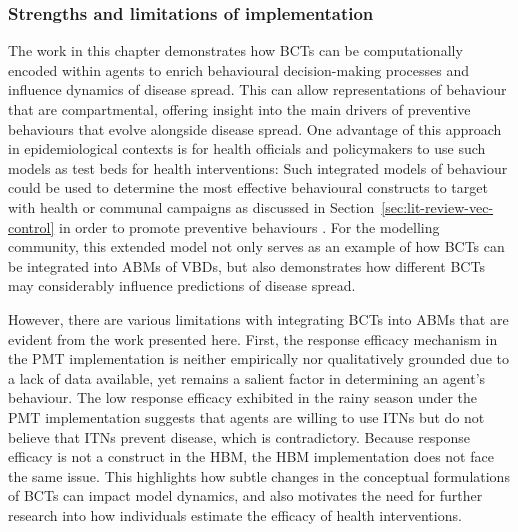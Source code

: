\subsubsection{Strengths and limitations of implementation}\label{sec:bcts-strengths-and-limitations}

The work in this chapter demonstrates how BCTs can be computationally encoded within agents to enrich behavioural decision-making processes and influence dynamics of disease spread. This can allow representations of behaviour that are compartmental, offering insight into the main drivers of preventive behaviours that evolve alongside disease spread. One advantage of this approach in epidemiological contexts is for health officials and policymakers to use such models as test beds for health interventions: Such integrated models of behaviour could be used to determine the most effective behavioural constructs to target with health or communal campaigns as discussed in Section~\ref{sec:lit-review-vec-control} in order to promote preventive behaviours \cite{mateus_c_modeling_2021, linard_multi-agent_2009, scheidegger_agent-based_2017}. For the modelling community, this extended model not only serves as an example of how BCTs can be integrated into ABMs of VBDs, but also demonstrates how different BCTs may considerably influence predictions of disease spread.

However, there are various limitations with integrating BCTs into ABMs that are evident from the work presented here. First, the response efficacy mechanism in the PMT implementation is neither empirically nor qualitatively grounded due to a lack of data available, yet remains a salient factor in determining an agent's behaviour. The low response efficacy exhibited in the rainy season under the PMT implementation suggests that agents are willing to use ITNs but do not believe that ITNs prevent disease, which is contradictory. Because response efficacy is not a construct in the HBM, the HBM implementation does not face the same issue. This highlights how subtle changes in the conceptual formulations of BCTs can impact model dynamics, and also motivates the need for further research into how individuals estimate the efficacy of health interventions.

